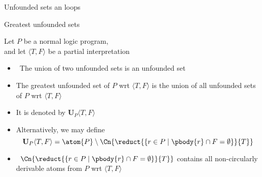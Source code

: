 \begin{frame}{Unfounded sets an loops}

\end{frame}
\begin{frame}{Greatest unfounded sets}\label{unf:greatest}

Let $P$ be a normal logic program,\\ and let
$\langle T,F \rangle$ be a partial interpretation

\begin{itemize}
\item<2->  \ The union of two unfounded sets is an unfounded set
\item<3-> The \alert{greatest unfounded set} of $P$ wrt $\langle T,F \rangle$ is the
  union of all unfounded sets of $P$ wrt $\langle T,F \rangle$
\item<4-> [] It is denoted by $\mathbf{U}_P\langle T,F \rangle$
\item<5-> Alternatively, we may define
  \[
  \mathbf{U}_P\langle T,F \rangle =
  \atom{P} \setminus
  \Cn{\reduct{\{r \in P \mid \pbody{r} \cap F = \emptyset\}}{T}}\/
  \]
\item<6->  \
  \(
  \Cn{\reduct{\{r \in P \mid \pbody{r} \cap F = \emptyset\}}{T}}
  \)
  contains all non-circularly derivable atoms from $P$ wrt $\langle T,F \rangle$
\end{itemize}
\end{frame}
